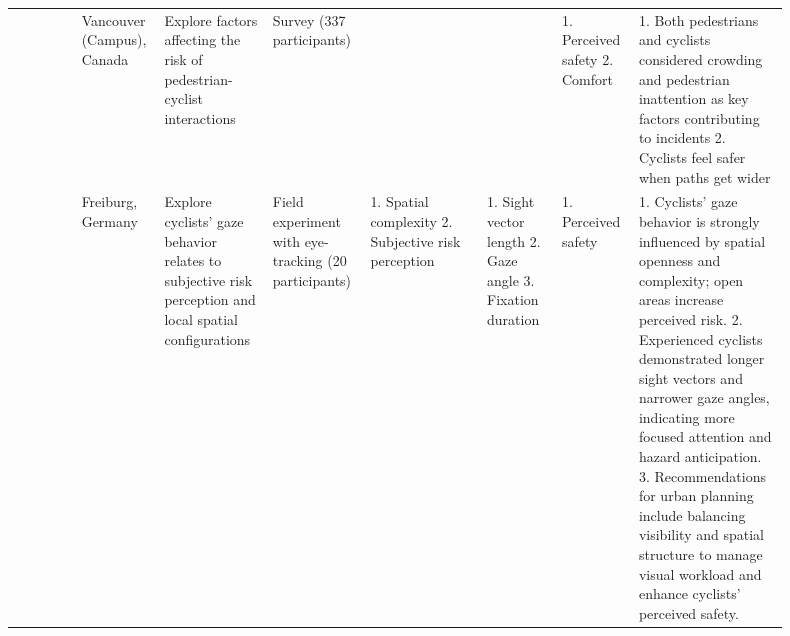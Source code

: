 {\begin{longtable}{@{}
    R{0.085\linewidth}
    R{0.075\linewidth}
    R{0.135\linewidth}
    R{0.095\linewidth}
    R{0.145\linewidth}
    R{0.095\linewidth}
    R{0.085\linewidth}
    R{0.185\linewidth}@{}}
  \citet{gkekas2020perceived}
    & Vancouver (Campus), Canada
    & Explore factors affecting the risk of pedestrian-cyclist interactions
    & Survey (337 participants)
    &
    &
    & 1. Perceived safety
      2. Comfort
    & 1. Both pedestrians and cyclists considered crowding and pedestrian
      inattention as key factors contributing to incidents
      2. Cyclists feel safer when paths get wider\\
  \addlinespace[4pt]

  \citet{stulpnagel2020gaze}
    & Freiburg, Germany
    & Explore cyclists' gaze behavior relates to subjective risk perception and
      local spatial configurations
    & Field experiment with eye-tracking (20 participants)
    & 1. Spatial complexity
      2. Subjective risk perception
    & 1. Sight vector length
      2. Gaze angle
      3. Fixation duration
    & 1. Perceived safety
    & 1. Cyclists' gaze behavior is strongly influenced by spatial openness and
      complexity; open areas increase perceived risk.
      2. Experienced cyclists demonstrated longer sight vectors and narrower
      gaze angles, indicating more focused attention and hazard anticipation.
      3. Recommendations for urban planning include balancing visibility and
      spatial structure to manage visual workload and enhance cyclists'
      perceived safety.\\
\end{longtable}
}

